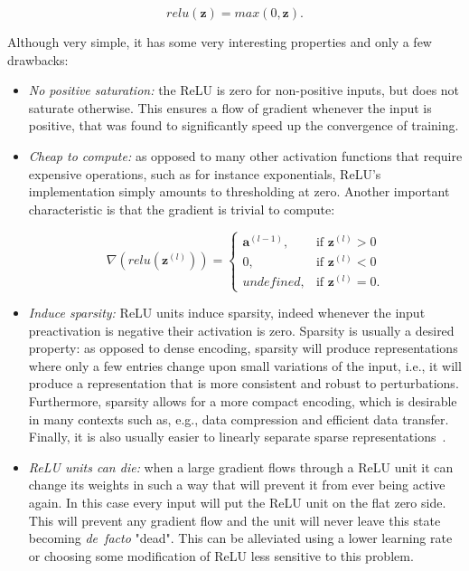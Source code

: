 \begin{equation}\label{eq:relu}
    relu(\mathbf{z}) = max(0, \mathbf{z}).
\end{equation}

Although very simple, it has some very interesting properties and only a few
drawbacks:

\begin{itemize}
    \item \emph{No positive saturation:} the ReLU is zero for non-positive
        inputs, but does not saturate otherwise. This ensures a flow of
        gradient whenever the input is positive, that was found to
        significantly speed up the convergence of training.
    \item \emph{Cheap to compute:} as opposed to many other activation
        functions that require expensive operations, such as for instance
        exponentials, ReLU's implementation simply amounts to thresholding at
        zero. Another important characteristic is that the gradient is trivial
        to compute:

        \begin{equation}\label{eq:relu_derivative}
            \nabla (relu(\mathbf{z}^{(l)})) =
                \begin{cases}
                    \mathbf{a}^{(l-1)},  & \text{if } \mathbf{z}^{(l)} > 0 \\
                    0,          & \text{if } \mathbf{z}^{(l)} < 0 \\
                    undefined,  & \text{if } \mathbf{z}^{(l)} = 0.
                \end{cases}
        \end{equation}

    \item \emph{Induce sparsity:} ReLU units induce sparsity, indeed whenever
        the input preactivation is negative their activation is zero. Sparsity
        is usually a desired property: as opposed to dense encoding, sparsity
        will produce representations where only a few entries change upon small
        variations of the input, i.e., it will produce a representation that is
        more consistent and robust to perturbations. Furthermore, sparsity
        allows for a more compact encoding, which is desirable in many contexts
        such as, e.g., data compression and efficient data transfer.  Finally,
        it is also usually easier to linearly separate sparse
        representations~\citep{Glorot+al-AI-2011-small}.
    \item \emph{ReLU units can die:} when a large gradient flows through a ReLU
        unit it can change its weights in such a way that will prevent it from
        ever being active again. In this case every input will put the ReLU
        unit on the flat zero side. This will prevent any gradient flow and the
        unit will never leave this state becoming \emph{de~facto} "dead". This
        can be alleviated using a lower learning rate or choosing some
        modification of ReLU less sensitive to this problem.
\end{itemize}

